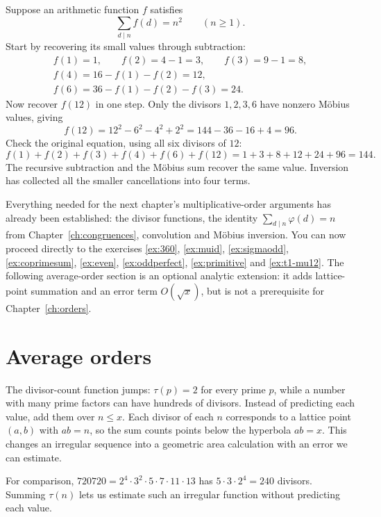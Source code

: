 Suppose an arithmetic function $f$ satisfies
\[
\sum_{d\mid n}f(d)=n^2\qquad(n\ge1).
\]
Start by recovering its small values through subtraction:
\[
\begin{gathered}
f(1)=1,\qquad f(2)=4-1=3,\qquad f(3)=9-1=8,\\
f(4)=16-f(1)-f(2)=12,\\
f(6)=36-f(1)-f(2)-f(3)=24.
\end{gathered}
\]
Now recover $f(12)$ in one step. Only the divisors $1,2,3,6$ have nonzero M\"obius values, giving
\[
f(12)=12^2-6^2-4^2+2^2=144-36-16+4=96.
\]
Check the original equation, using all six divisors of $12$:
\[
f(1)+f(2)+f(3)+f(4)+f(6)+f(12)
=1+3+8+12+24+96=144.
\]
The recursive subtraction and the M\"obius sum recover the same value.
Inversion has collected all the smaller cancellations into four terms.

\begin{reminder}
Everything needed for the next chapter's multiplicative-order arguments
has already been established: the divisor functions, the identity
$\sum_{d\mid n}\varphi(d)=n$ from Chapter~\ref{ch:congruences},
convolution and M\"obius inversion. You can now proceed directly to the
exercises \ref{ex:360}, \ref{ex:muid}, \ref{ex:sigmaodd},
\ref{ex:coprimesum}, \ref{ex:even}, \ref{ex:oddperfect},
\ref{ex:primitive} and \ref{ex:t1-mu12}.
The following average-order section is an optional analytic extension:
it adds lattice-point summation and an error term $O(\sqrt{x})$,
but is not a prerequisite for Chapter~\ref{ch:orders}.
\end{reminder}

\section{Average orders}

The divisor-count function jumps: $\tau(p)=2$ for every prime $p$, while a number with many prime factors can have hundreds of divisors. Instead of predicting each value, add them over $n\le x$. Each divisor of each $n$ corresponds to a lattice point $(a,b)$ with $ab=n$, so the sum counts points below the hyperbola $ab=x$. This changes an irregular sequence into a geometric area calculation with an error we can estimate.

For comparison, $720720=2^4\cdot3^2\cdot5\cdot7\cdot11\cdot13$ has $5\cdot3\cdot2^4=240$ divisors. Summing $\tau(n)$ lets us estimate such an irregular function without predicting each value.

